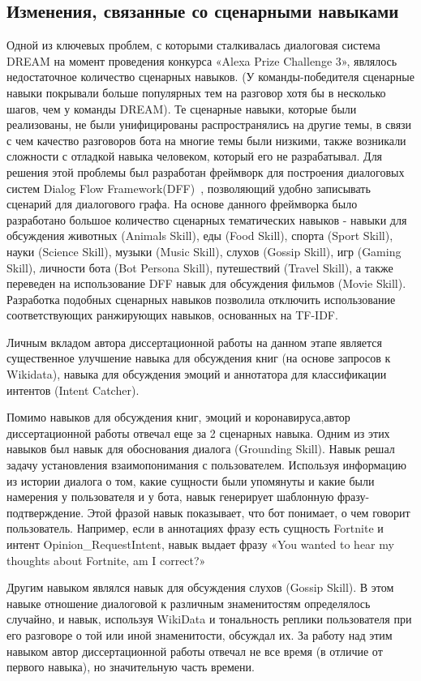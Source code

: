 \subsection{Изменения, связанные со сценарными навыками}
Одной из ключевых проблем, с которыми сталкивалась диалоговая система {DREAM} на момент проведения конкурса «Alexa Prize Challenge 3», являлось недостаточное количество сценарных навыков. (У команды-победителя сценарные навыки покрывали больше популярных тем на разговор хотя бы в несколько шагов, чем у команды DREAM). Те сценарные навыки, которые были реализованы, не были унифицированы распространялись на другие темы, в связи с чем качество разговоров бота на многие темы были низкими, также возникали сложности с отладкой навыка человеком, который его не разрабатывал. Для решения этой проблемы был разработан фреймворк для построения диалоговых систем Dialog Flow Framework(DFF)~\cite{dff}, позволяющий удобно записывать сценарий для диалогового графа. На основе данного фреймворка было разработано большое количество сценарных тематических навыков - навыки для обсуждения животных (Animals Skill), еды (Food Skill), спорта (Sport Skill), науки (Science Skill), музыки (Music Skill), слухов (Gossip Skill), игр (Gaming Skill), личности бота (Bot Persona Skill), путешествий (Travel Skill), а также переведен на использование DFF навык для обсуждения фильмов (Movie Skill). Разработка подобных сценарных навыков позволила отключить использование соответствующих ранжирующих навыков, основанных на TF-IDF.

Личным вкладом автора диссертационной работы на данном этапе является существенное улучшение навыка для обсуждения книг (на основе запросов к Wikidata), навыка для обсуждения эмоций и аннотатора для классификации интентов (Intent Catcher).

Помимо навыков для обсуждения книг, эмоций и коронавируса,автор диссертационной работы отвечал еще за 2 сценарных навыка.
Одним из этих навыков был навык для обоснования диалога (Grounding Skill). Навык решал задачу установления взаимопонимания с пользователем. Используя информацию из истории диалога о том, какие сущности были упомянуты и какие были намерения у пользователя и у бота, навык генерирует шаблонную фразу-подтверждение. Этой фразой навык показывает, что бот понимает, о чем говорит пользователь. Например, если в аннотациях фразу есть сущность Fortnite и интент Opinion\_RequestIntent, навык выдает фразу «You wanted to hear my thoughts about Fortnite, am I correct?»

Другим навыком являлся навык для обсуждения слухов (Gossip Skill). В этом навыке отношение диалоговой к различным знаменитостям определялось случайно, и навык, используя WikiData и тональность реплики пользователя при его разговоре о той или иной знаменитости, обсуждал их. За работу над этим навыком автор диссертационной работы отвечал не все время (в отличие от первого навыка), но значительную часть времени.

